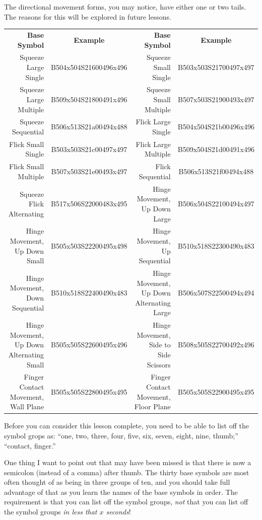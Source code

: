 \documentclass{article}
\begin{document}
The directional movement forms, you may notice, have either one or two tails.
The reasons for this will be explored in future lessons.

\begin{center}
\begin{tabular}{rcrc}
\textbf{Base Symbol}&\textbf{Example}&\textbf{Base Symbol}&\textbf{Example}\\
Squeeze Large Single                     &B504x504S21600496x496&Squeeze Small Single                     &B503x503S21700497x497\\
Squeeze Large Multiple                   &B509x504S21800491x496&Squeeze Small Multiple                   &B507x503S21900493x497\\
Squeeze Sequential                       &B506x513S21a00494x488&Flick Large Single                       &B504x504S21b00496x496\\
Flick Small Single                       &B503x503S21c00497x497&Flick Large Multiple                     &B509x504S21d00491x496\\
Flick Small Multiple                     &B507x503S21e00493x497&Flick Sequential                         &B506x513S21f00494x488\\
Squeeze Flick Alternating                &B517x506S22000483x495&Hinge Movement, Up Down Large            &B506x504S22100494x497\\
Hinge Movement, Up Down Small            &B505x503S22200495x498&Hinge Movement, Up Sequential            &B510x518S22300490x483\\
Hinge Movement, Down Sequential          &B510x518S22400490x483&Hinge Movement, Up Down Alternating Large&B506x507S22500494x494\\
Hinge Movement, Up Down Alternating Small&B505x505S22600495x496&Hinge Movement, Side to Side Scissors    &B508x505S22700492x496\\
Finger Contact Movement, Wall Plane      &B505x505S22800495x495&Finger Contact Movement, Floor Plane     &B505x505S22900495x495\\
\end{tabular}
\end{center}

Before you can consider this lesson complete, you need to be able to list off the symbol grops as:
``one, two, three, four, five, six, seven, eight, nine, thumb;''
``contact, finger.''

One thing I want to point out that may have been missed is that there is now a semicolon (instead of a comma) after thumb.
The thirty base symbols are most often thought of as being in three groups of ten, and you should take full advantage of that as you learn the names of the base symbols in order.
The requirement is that you can list off the symbol groups, \emph{not} that you can list off the symbol groups \emph{in less that $x$ seconds}!
\end{document}
